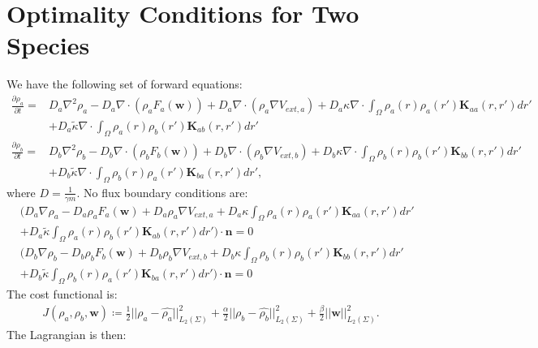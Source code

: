 \documentclass[11pt, a4paper]{article}
\theoremstyle{definition}
\newcommand{\ra}{\rho_a}
\newcommand{\rb}{\rho_b}
\newcommand{\w}{\mathbf{w}}
\newcommand{\n}{\mathbf{n}}
\newcommand{\K}{\mathbf{K}}
\begin{document}
	\section*{Optimality Conditions for Two Species}
	We have the following set of forward equations:
	\begin{align*}
	\frac{\partial \ra}{\partial t} =& D_a\nabla^2 \ra - D_a\nabla \cdot(\ra F_a(\w)) + D_a \nabla \cdot (\ra \nabla V_{ext,a}) + D_a\kappa \nabla \cdot \int_\Omega \ra(r) \ra (r') \K_{aa}(r,r')dr' \\
	&+  D_a\tilde{\kappa}\nabla \cdot \int_\Omega \ra(r) \rb (r') \K_{ab}(r,r')dr'\\
	\frac{\partial \rb}{\partial t} =& D_b\nabla^2 \rb - D_b\nabla \cdot(\rb F_b(\w)) + D_b \nabla \cdot (\rb \nabla V_{ext,b}) + D_b\kappa \nabla \cdot \int_\Omega \rb(r) \rb (r') \K_{bb}(r,r')dr' \\
	&+  D_b\tilde{\kappa} \nabla \cdot \int_\Omega \rb(r) \ra (r') \K_{ba}(r,r')dr',
	\end{align*}
	where $D = \frac{1}{\gamma m}$.
	No flux boundary conditions are:
	\begin{align*}
	&\bigg( D_a \nabla \ra - D_a \ra F_a(\w) + D_a \ra \nabla V_{ext,a} + D_a\kappa \int_\Omega \ra(r) \ra (r') \K_{aa}(r,r')dr' \\
	&+  D_a\tilde{\kappa} \int_\Omega \ra(r) \rb (r') \K_{ab}(r,r')dr' \bigg) \cdot \n = 0\\
	&\bigg( D_b \nabla \rb - D_b \rb F_b(\w) + D_b \rb \nabla V_{ext,b} + D_b\kappa \int_\Omega \rb(r) \rb (r')\K_{bb}(r,r')dr' \\
	&+  D_b\tilde{\kappa} \int_\Omega \rb(r) \ra (r') \K_{ba}(r,r')dr' \bigg) \cdot \n = 0
	\end{align*}
	The cost functional is:
	\begin{align*}
	J(\ra,\rb, \w) \coloneqq \frac{1}{2}|| \ra - \widehat{\ra} ||^2_{L_2(\Sigma)} + \frac{\alpha}{2}|| \rb - \widehat {\rb} ||^2_{L_2(\Sigma)} + \frac{\beta}{2}||\w||^2_{L_2(\Sigma)}.
	\end{align*}
	The Lagrangian is then:
\end{document}
